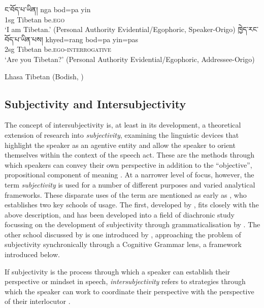 \begin{exe}
\ex\label{ex:OrigoShift}
\begin{xlist}
\ex\label{ex:OrigoShift:a} \texttibetan{ང་བོད་པ་ཡིན།}
\gll nga bod=pa yin \\
1sg Tibetan be.\textsc{ego} \\
\glt `I am Tibetan.' (Personal Authority Evidential/Egophoric, Speaker-Origo)
\ex\label{ex:OrigoShift:b} \texttibetan{ཁྱེད་རང་བོད་པ་ཡིན་པས།}
\gll khyed=rang bod=pa yin=pas \\
2sg Tibetan be.\textsc{ego}-\textsc{interrogative} \\
\glt `Are you Tibetan?' (Personal Authority Evidential/Egophoric, Addressee-Origo)
\end{xlist}
Lhasa Tibetan (Bodish, \tibetnat) \cite[394]{DeLancey2017Tibetan}
\end{exe}

\subsection{Subjectivity and Intersubjectivity}
The concept of intersubjectivity is, at least in its development, a theoretical extension of research into \textit{subjectivity}, examining the linguistic devices that highlight the speaker as an agentive entity and allow the speaker to orient themselves within the context of the speech act. These are the methods through which speakers can convey their own perspective in addition to the ``objective'', propositional component of meaning \cite{Finegan1995}. At a narrower level of focus, however, the term \textit{subjectivity} is used for a number of different purposes and varied analytical frameworks. These disparate uses of the term are mentioned as early as , who establishes two key schools of usage. The first, developed by , fits closely with the above description, and has been developed into a field of diachronic study focussing on the development of subjectivity through grammaticalisation by . The other school discussed by  is one introduced by , approaching the problem of subjectivity synchronically through a Cognitive Grammar lens, a framework introduced below.
    
If subjectivity is the process through which a speaker can establish their perspective or mindset in speech, \textit{intersubjectivity} refers to strategies through which the speaker can work to coordinate their perspective with the perspective of their interlocutor \cite{Brems2014}.

